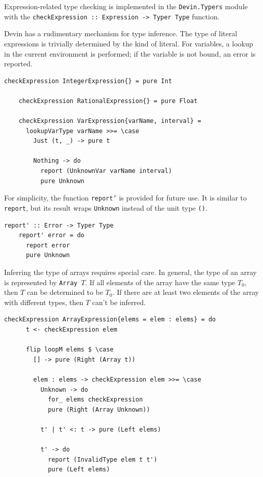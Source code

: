 \documentclass[UdineBachThesis,american,11pt]{PhdThesis}
\begin{document}
  Expression-related type checking is implemented in the
  \mbox{\texttt{Devin.Typers}} module with the
  \mbox{\texttt{checkExpression :: Expression -> Typer Type}} function.

  Devin has a rudimentary mechanism for type inference. The type of literal
  expressions is trivially determined by the kind of literal. For variables, a
  lookup in the current environment is performed; if the variable is not bound,
  an error is reported.

  \begin{Verbatim}[gobble=4,fontsize=\small]
    checkExpression IntegerExpression{} = pure Int

    checkExpression RationalExpression{} = pure Float

    checkExpression VarExpression{varName, interval} =
      lookupVarType varName >>= \case
        Just (t, _) -> pure t

        Nothing -> do
          report (UnknownVar varName interval)
          pure Unknown
  \end{Verbatim}

  For simplicity, the function \mbox{\texttt{report'}} is provided for future
  use. It is similar to \mbox{\texttt{report}}, but its result wraps
  \mbox{\texttt{Unknown}} instead of the unit type \mbox{\texttt{()}}.

  \begin{Verbatim}[gobble=4,fontsize=\small]
    report' :: Error -> Typer Type
    report' error = do
      report error
      pure Unknown
  \end{Verbatim}

  Inferring the type of arrays requires special care. In general, the type of an
  array is represented by \mbox{\texttt{Array $T$}}. If all elements of the
  array have the same type \mbox{$T_0$}, then $T$ can be determined to be
  \mbox{$T_0$}. If there are at least two elements of the array with different
  types, then $T$ can't be inferred.

  \begin{Verbatim}[gobble=4,fontsize=\small]
    checkExpression ArrayExpression{elems = elem : elems} = do
      t <- checkExpression elem

      flip loopM elems $ \case
        [] -> pure (Right (Array t))

        elem : elems -> checkExpression elem >>= \case
          Unknown -> do
            for_ elems checkExpression
            pure (Right (Array Unknown))

          t' | t' <: t -> pure (Left elems)

          t' -> do
            report (InvalidType elem t t')
            pure (Left elems)
  \end{Verbatim}
\end{document}
